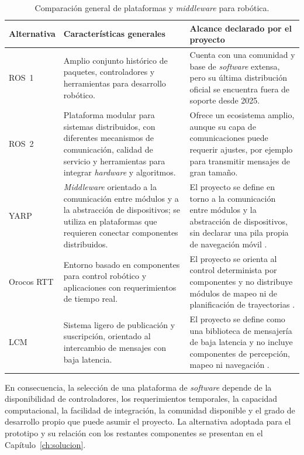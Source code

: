 \begin{table}[htbp]
\centering
\caption{Comparación general de plataformas y \textit{middleware} para robótica.}
\label{tab:comparativa_middleware}
\small
\begin{tabular}{P{2.1cm} P{5.4cm} P{6.3cm}}
\toprule
\textbf{Alternativa} &
\textbf{Características generales} &
\textbf{Alcance declarado por el proyecto} \\
\midrule

ROS~1 &
Amplio conjunto histórico de paquetes, controladores y herramientas para
desarrollo robótico. &
Cuenta con una comunidad y base de \textit{software} extensa, pero su última
distribución oficial se encuentra fuera de soporte desde 2025.
\citep{ros_noetic_eol} \\

ROS~2 &
Plataforma modular para sistemas distribuidos, con diferentes mecanismos de
comunicación, calidad de servicio y herramientas para integrar \textit{hardware} y
algoritmos. &
Ofrece un ecosistema amplio, aunque su capa de comunicaciones puede requerir
ajustes, por ejemplo para transmitir mensajes de gran tamaño.
\citep{macenski2022ros2} \\

YARP &
\textit{Middleware} orientado a la comunicación entre módulos y a la abstracción de
dispositivos; se utiliza en plataformas que requieren conectar componentes
distribuidos. &
El proyecto se define en torno a la comunicación entre módulos y la
abstracción de dispositivos, sin declarar una pila propia de navegación
móvil \citep{yarp_docs}. \\

Orocos RTT &
Entorno basado en componentes para control robótico y aplicaciones con
requerimientos de tiempo real. &
El proyecto se orienta al control determinista por componentes y no
distribuye módulos de mapeo ni de planificación de trayectorias
\citep{orocos_rtt}.\\

LCM &
Sistema ligero de publicación y suscripción, orientado al intercambio de
mensajes con baja latencia. &
El proyecto se define como una biblioteca de mensajería de baja latencia y
no incluye componentes de percepción, mapeo ni navegación
\citep{lcm_docs}.\\

\bottomrule
\end{tabular}
\end{table}
En consecuencia, la selección de una plataforma de \textit{software} depende de la
disponibilidad de controladores, los requerimientos temporales, la capacidad
computacional, la facilidad de integración, la comunidad disponible y el
grado de desarrollo propio que puede asumir el proyecto. La alternativa
adoptada para el prototipo y su relación con los restantes componentes se
presentan en el Capítulo~\ref{ch:solucion}.

